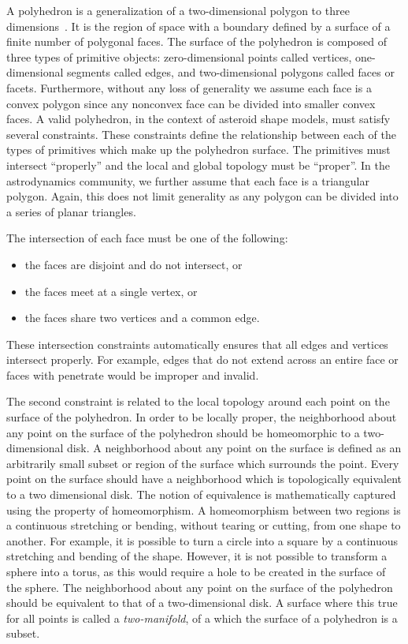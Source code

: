 A polyhedron is a generalization of a two-dimensional polygon to three dimensions~\cite{orourke1998}.
It is the region of space with a boundary defined by a surface of a finite number of polygonal faces.
The surface of the polyhedron is composed of three types of primitive objects: zero-dimensional points called vertices, one-dimensional segments called edges, and two-dimensional polygons called faces or facets.
Furthermore, without any loss of generality we assume each face is a convex polygon since any nonconvex face can be divided into smaller convex faces.
A valid polyhedron, in the context of asteroid shape models, must satisfy several constraints.
These constraints define the relationship between each of the types of primitives which make up the polyhedron surface.
The primitives must intersect ``properly'' and the local and global topology must be ``proper''.
In the astrodynamics community, we further assume that each face is a triangular polygon.
Again, this does not limit generality as any polygon can be divided into a series of planar triangles.

The intersection of each face must be one of the following:
\begin{itemize}
    \item the faces are disjoint and do not intersect, or
    \item the faces meet at a single vertex, or
    \item the faces share two vertices and a common edge.
\end{itemize}
These intersection constraints automatically ensures that all edges and vertices intersect properly.
For example, edges that do not extend across an entire face or faces with penetrate would be improper and invalid.

The second constraint is related to the local topology around each point on the surface of the polyhedron.
In order to be locally proper, the neighborhood about any point on the surface of the polyhedron should be homeomorphic to a two-dimensional disk.
A neighborhood about any point on the surface is defined as an arbitrarily small subset or region of the surface which surrounds the point.
Every point on the surface should have a neighborhood which is topologically equivalent to a two dimensional disk.
The notion of equivalence is mathematically captured using the property of homeomorphism.
A homeomorphism between two regions is a continuous stretching or bending, without tearing or cutting, from one shape to another.
For example, it is possible to turn a circle into a square by a continuous stretching and bending of the shape.
However, it is not possible to transform a sphere into a torus, as this would require a hole to be created in the surface of the sphere.
The neighborhood about any point on the surface of the polyhedron should be equivalent to that of a two-dimensional disk.
A surface where this true for all points is called a \textit{two-manifold}, of a which the surface of a polyhedron is a subset.

